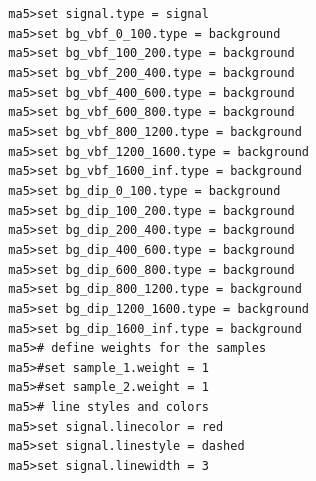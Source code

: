 \documentclass[a4paper, 10pt]{article}
\begin{document}
\texttt{ }\texttt{ }\texttt{ma5>set signal.type = signal\\
}
\texttt{ }\texttt{ }\texttt{ma5>set bg\_vbf\_0\_100.type = background\\
}
\texttt{ }\texttt{ }\texttt{ma5>set bg\_vbf\_100\_200.type = background\\
}
\texttt{ }\texttt{ }\texttt{ma5>set bg\_vbf\_200\_400.type  = background\\
}
\texttt{ }\texttt{ }\texttt{ma5>set bg\_vbf\_400\_600.type  = background\\
}
\texttt{ }\texttt{ }\texttt{ma5>set bg\_vbf\_600\_800.type  = background\\
}
\texttt{ }\texttt{ }\texttt{ma5>set bg\_vbf\_800\_1200.type  = background\\
}
\texttt{ }\texttt{ }\texttt{ma5>set bg\_vbf\_1200\_1600.type  = background\\
}
\texttt{ }\texttt{ }\texttt{ma5>set bg\_vbf\_1600\_inf.type = background\\
}
\texttt{ }\texttt{ }\texttt{ma5>set bg\_dip\_0\_100.type = background\\
}
\texttt{ }\texttt{ }\texttt{ma5>set bg\_dip\_100\_200.type = background\\
}
\texttt{ }\texttt{ }\texttt{ma5>set bg\_dip\_200\_400.type = background\\
}
\texttt{ }\texttt{ }\texttt{ma5>set bg\_dip\_400\_600.type = background\\
}
\texttt{ }\texttt{ }\texttt{ma5>set bg\_dip\_600\_800.type = background\\
}
\texttt{ }\texttt{ }\texttt{ma5>set bg\_dip\_800\_1200.type = background\\
}
\texttt{ }\texttt{ }\texttt{ma5>set bg\_dip\_1200\_1600.type = background\\
}
\texttt{ }\texttt{ }\texttt{ma5>set bg\_dip\_1600\_inf.type = background\\
}
\texttt{ }\texttt{ }\texttt{ma5>\# define weights for the samples\\
}
\texttt{ }\texttt{ }\texttt{ma5>\#set sample\_1.weight = 1\\
}
\texttt{ }\texttt{ }\texttt{ma5>\#set sample\_2.weight = 1\\
}
\texttt{ }\texttt{ }\texttt{ma5>\# line styles and colors\\
}
\texttt{ }\texttt{ }\texttt{ma5>set signal.linecolor = red\\
}
\texttt{ }\texttt{ }\texttt{ma5>set signal.linestyle = dashed\\
}
\texttt{ }\texttt{ }\texttt{ma5>set signal.linewidth = 3\\
}
\end{document}
